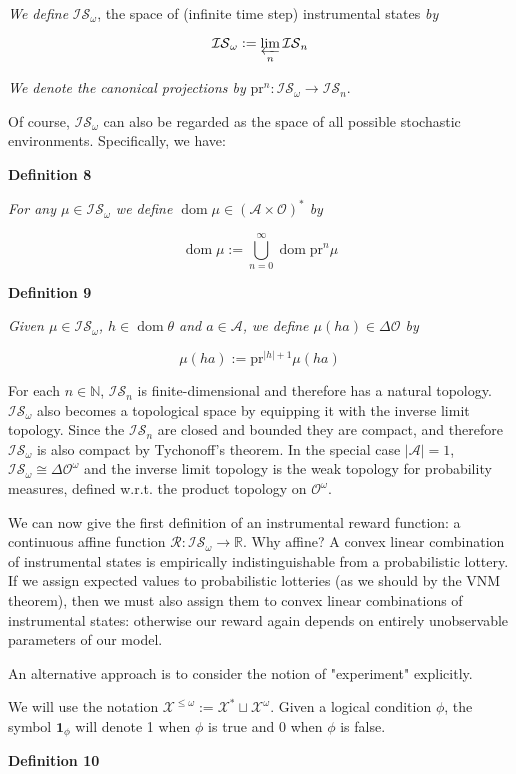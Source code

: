 \documentclass[a4paper]{article}
\newcommand{\Co}[1]{}
\DeclareMathOperator{\Dom}{dom}
\newcommand{\AP}[1]{\left(#1\right)}
\newcommand{\Nats}{\mathbb{N}}
\newcommand{\Reals}{\mathbb{R}}
\newcommand{\Abs}[1]{\left\vert #1 \right\vert}
\newcommand{\A}{\mathcal{A}}
\newcommand{\Ob}{\mathcal{O}}
\newcommand{\FH}{\AP{\A\times\Ob}^*}
\newcommand{\R}{\mathcal{R}}
\newcommand{\IS}{\mathcal{IS}}
\newcommand{\Prj}{\mathrm{pr}}
\begin{document}
\textit{We define}\Co{i} $\IS_\omega$, the space of (infinite time step) instrumental states \textit{by}\Co{i}

$$\IS_\omega:=\varprojlim_n \IS_n$$

\textit{We denote the canonical projections by}\Co{i} $\Prj^n:\IS_\omega\rightarrow\IS_n$.

Of course, $\IS_\omega$ can also be regarded as the space of all possible stochastic environments. Specifically, we have:

\textbf{Definition 8}\Co{b}

\textit{For any $\mu\in\IS_\omega$ we define $\Dom\mu\in\FH$ by}\Co{i}

$$\Dom\mu:=\bigcup_{n=0}^\infty \Dom\Prj^n\mu$$

\textbf{Definition 9}\Co{b}

\textit{Given $\mu\in\IS_\omega$, $h\in\Dom\theta$ and $a\in\A$, we define $\mu(ha)\in\Delta\Ob$ by}\Co{i}

$$\mu(ha):=\Prj^{\Abs{h}+1}\mu(ha)$$

For each $n\in\Nats$, $\IS_n$ is finite-dimensional and therefore has a natural topology. $\IS_\omega$ also becomes a topological space by equipping it with the inverse limit topology. Since the $\IS_n$ are closed and bounded they are compact, and therefore $\IS_\omega$ is also compact by Tychonoff's theorem. In the special case $\Abs{\A}=1$, $\IS_\omega\cong\Delta\Ob^\omega$ and the inverse limit topology is the weak topology for probability measures, defined w.r.t. the product topology on $\Ob^\omega$.

We can now give the first definition of an instrumental reward function: a continuous affine function $\R: \IS_\omega \rightarrow \Reals$. Why affine? A convex linear combination of instrumental states is empirically indistinguishable from a probabilistic lottery. If we assign expected values to probabilistic lotteries (as we should by the VNM theorem), then we must also assign them to convex linear combinations of instrumental states: otherwise our reward again depends on entirely unobservable parameters of our model.

An alternative approach is to consider the notion of "experiment" explicitly.

We will use the notation $\mathcal{X}^{\leq\omega}:=\mathcal{X}^*\sqcup\mathcal{X}^\omega$. Given a logical condition $\phi$, the symbol $\boldsymbol{1}_\phi$ will denote 1 when $\phi$ is true and 0 when $\phi$ is false.

\textbf{Definition 10}\Co{b}
\end{document}

